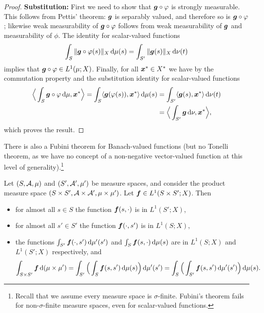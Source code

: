 \begin{proof}
  \textbf{Substitution:}
  First we need to show that $\bm{g} \circ \varphi$ is strongly measurable.
  This follows from Pettis' theorem: $\bm{g}$ is separably valued, and therefore so is $\bm{g} \circ \varphi$; likewise weak measurability of $\bm{g} \circ \varphi$ follows from weak measurability of $\bm{g}$ and measurability of $\phi$.
    The identity for scalar-valued functions
    \begin{equation*}
      \int_{S} \|\bm{g} \circ \varphi(s)\|_X \, \mathrm{d}\mu(s) = \int_{S'} \|\bm{g}(s)\|_X \, \mathrm{d}\nu(t)
    \end{equation*}
    implies that $\bm{g} \circ \varphi \in L^1(\mu;X)$.
    Finally, for all $\bm{x}^* \in X^*$ we have by the commutation property and the substitution identity for scalar-valued functions
    \begin{equation*}
      \begin{aligned}
        \Big\langle \int_S \bm{g} \circ \varphi \, \mathrm{d}\mu , \bm{x}^* \Big\rangle
        = \int_S \langle \bm{g}(\varphi(s)), \bm{x}^* \rangle \, \mathrm{d}\mu(s)
        &= \int_{S'} \langle \bm{g}(s), \bm{x}^* \rangle \, \mathrm{d}\nu(t) \\
        &= \Big\langle \int_{S'} \bm{g} \, \mathrm{d}\nu, \bm{x}^* \Big\rangle,
      \end{aligned}
    \end{equation*}
    which proves the result.
\end{proof}

There is also a Fubini theorem for Banach-valued functions (but no Tonelli theorem, as we have no concept of a non-negative vector-valued function at this level of generality).\footnote{Recall that we assume every measure space is $\sigma$-finite. Fubini's theorem fails for non-$\sigma$-finite measure spaces, even for scalar-valued functions.}

\begin{prop}[Fubini]
  Let $(S,\mathcal{A},\mu)$ and $(S',\mathcal{A}',\mu')$ be measure spaces, and consider the product measure space $(S \times S', \mathcal{A} \times \mathcal{A}', \mu \times \mu')$.
  Let $\bm{f} \in L^1(S \times S'; X)$.
  Then
  \begin{itemize}
  \item for almost all $s \in S$ the function $\bm{f}(s,\cdot)$ is in $L^1(S';X)$,
  \item for almost all $s' \in S'$ the function $\bm{f}(\cdot,s')$ is in $L^1(S;X)$,
  \item the functions $\int_{S'} \bm{f}(\cdot,s') \, \mathrm{d}\mu'(s')$ and $\int_{S} \bm{f}(s,\cdot) \, \mathrm{d}\mu(s)$ are in $L^1(S;X)$ and $L^1(S';X)$ respectively, and
    \begin{equation}\label{eq:fubini}
      \int_{S \times S'} \bm{f} \, \mathrm{d}(\mu \times \mu') = \int_{S'} \Big(  \int_S \bm{f}(s,s') \, \mathrm{d}\mu(s) \Big) \, \mathrm{d}\mu'(s') = \int_S \Big(\int_{S'} \bm{f}(s,s') \, \mathrm{d}\mu'(s') \Big) \, \mathrm{d}\mu(s).
    \end{equation}
  \end{itemize}
\end{prop}

